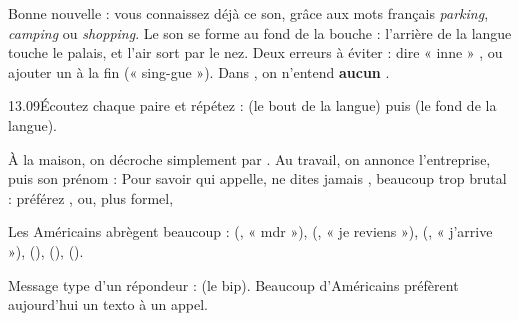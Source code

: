 
\begin{attention}
\end{attention}


Bonne nouvelle : vous connaissez déjà ce son, grâce aux mots français \textit{parking},
\textit{camping} ou \textit{shopping}. Le son  se forme au fond de la bouche : l'arrière de la
langue touche le palais, et l'air sort par le nez. Deux erreurs à éviter : dire « inne » , ou
ajouter un  à la fin (« sing-gue »). Dans , on n'entend \textbf{aucun} .

\begin{paires}{13.09}{Écoutez chaque paire et répétez :  (le bout de la langue) puis 
(le fond de la langue).}
\end{paires}


\begin{culture}
À la maison, on décroche simplement par . Au travail, on annonce l'entreprise, puis son
prénom :  Pour savoir qui appelle, ne dites jamais
, beaucoup trop brutal : préférez , ou, plus formel,
\end{culture}

\begin{paire}
\begin{culture}
Les Américains abrègent beaucoup :  (, « mdr »),  (, « je reviens »),  (, « j'arrive »),  (),
 (),  ().
\end{culture}
\begin{culture}[La messagerie]
Message type d'un répondeur :  (le bip). Beaucoup d'Américains préfèrent aujourd'hui un texto à un appel.
\end{culture}
\end{paire}

